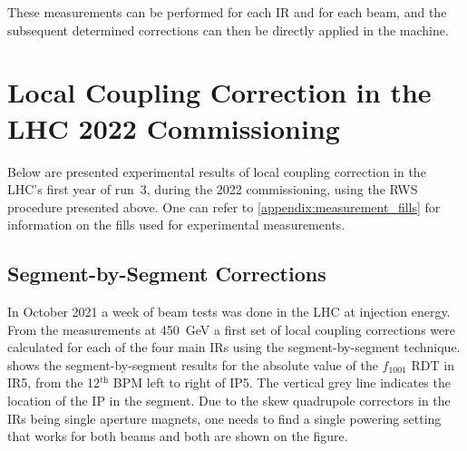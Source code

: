 These measurements can be performed for each IR and for each beam, and the subsequent determined corrections can then be directly applied in the machine.

\section{Local Coupling Correction in the LHC 2022 Commissioning}
\label{section:rws_experimental_results}

Below are presented experimental results of local coupling correction in the \acrshort{LHC}'s first year of \Gls{run}~\num{3}, during the \num{2022} commissioning, using the \gls{RWS} procedure presented above.
One can refer to \cref{appendix:measurement_fills} for information on the fills used for experimental measurements.

\subsection{Segment-by-Segment Corrections}
\label{subsection:sbs_corrections}

In October \num{2021} a week of beam tests was done in the LHC at injection energy.
From the measurements at \qty{450}{\giga\electronvolt} a first set of local coupling corrections were calculated for each of the four main \glspl{IR} using the segment-by-segment technique.
 shows the segment-by-segment results for the absolute value of the \(f_{1001}\) \gls{RDT} in IR\num{5}, from the \num{12}\({}^\mathrm{th}\) BPM left to right of IP\num{5}.
The vertical grey line indicates the location of the IP in the segment.
Due to the \gls{skew} quadrupole correctors in the IRs being single aperture magnets, one needs to find a single powering setting that works for both beams and both are shown on the figure.

